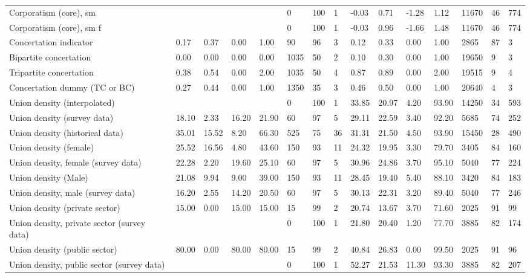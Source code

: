 \begin{longtable}{lllllllllllllll}
\addlinespace
Corporatism (core), sm &  &  &  &  & 0 & 100 & 1 & -0.03 & 0.71 & -1.28 & 1.12 & 11670 & 46 & 774\\
Corporatism (core), sm f &  &  &  &  & 0 & 100 & 1 & -0.03 & 0.96 & -1.66 & 1.48 & 11670 & 46 & 774\\
Concertation indicator & 0.17 & 0.37 & 0.00 & 1.00 & 90 & 96 & 3 & 0.12 & 0.33 & 0.00 & 1.00 & 2865 & 87 & 3\\
Bipartite concertation & 0.00 & 0.00 & 0.00 & 0.00 & 1035 & 50 & 2 & 0.10 & 0.30 & 0.00 & 1.00 & 19650 & 9 & 3\\
Tripartite concertation & 0.38 & 0.54 & 0.00 & 2.00 & 1035 & 50 & 4 & 0.87 & 0.89 & 0.00 & 2.00 & 19515 & 9 & 4\\
\addlinespace
Concertation dummy (TC or BC) & 0.27 & 0.44 & 0.00 & 1.00 & 1350 & 35 & 3 & 0.46 & 0.50 & 0.00 & 1.00 & 20640 & 4 & 3\\
Union density (interpolated) &  &  &  &  & 0 & 100 & 1 & 33.85 & 20.97 & 4.20 & 93.90 & 14250 & 34 & 593\\
Union density (survey data) & 18.10 & 2.33 & 16.20 & 21.90 & 60 & 97 & 5 & 29.11 & 22.59 & 3.40 & 92.20 & 5685 & 74 & 252\\
Union density (historical data) & 35.01 & 15.52 & 8.20 & 66.30 & 525 & 75 & 36 & 31.31 & 21.50 & 4.50 & 93.90 & 15450 & 28 & 490\\
Union density (female) & 25.52 & 16.56 & 4.80 & 43.60 & 150 & 93 & 11 & 24.32 & 19.95 & 3.30 & 79.70 & 3405 & 84 & 160\\
\addlinespace
Union density, female (survey data) & 22.28 & 2.20 & 19.60 & 25.10 & 60 & 97 & 5 & 30.96 & 24.86 & 3.70 & 95.10 & 5040 & 77 & 224\\
Union density (Male) & 21.08 & 9.94 & 9.00 & 39.00 & 150 & 93 & 11 & 28.45 & 19.40 & 5.40 & 88.10 & 3420 & 84 & 183\\
Union density, male (survey data) & 16.20 & 2.55 & 14.20 & 20.50 & 60 & 97 & 5 & 30.13 & 22.31 & 3.20 & 89.40 & 5040 & 77 & 246\\
Union density (private sector) & 15.00 & 0.00 & 15.00 & 15.00 & 15 & 99 & 2 & 20.74 & 13.67 & 3.70 & 71.60 & 2025 & 91 & 99\\
Union density, private sector (survey data) &  &  &  &  & 0 & 100 & 1 & 21.80 & 20.40 & 1.20 & 77.70 & 3885 & 82 & 174\\
\addlinespace
Union density (public sector) & 80.00 & 0.00 & 80.00 & 80.00 & 15 & 99 & 2 & 40.84 & 26.83 & 0.00 & 99.50 & 2025 & 91 & 96\\
Union density, public sector (survey data) &  &  &  &  & 0 & 100 & 1 & 52.27 & 21.53 & 11.30 & 93.30 & 3885 & 82 & 207\\

\end{longtable}
